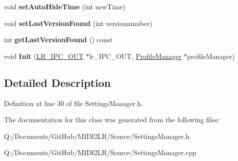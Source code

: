 \begin{DoxyCompactItemize}
\item 
void {\bfseries set\+Auto\+Hide\+Time} (int new\+Time)\hypertarget{class_settings_manager_a3b79a29f105519854b113d689e345f31}{}\label{class_settings_manager_a3b79a29f105519854b113d689e345f31}

\item 
void {\bfseries set\+Last\+Version\+Found} (int versionnumber)\hypertarget{class_settings_manager_ab66b7b0beeca459d573fe47b4a4f80b8}{}\label{class_settings_manager_ab66b7b0beeca459d573fe47b4a4f80b8}

\item 
int {\bfseries get\+Last\+Version\+Found} () const \hypertarget{class_settings_manager_ae5a55056fadea3ec3a015149ed5949a5}{}\label{class_settings_manager_ae5a55056fadea3ec3a015149ed5949a5}

\item 
void {\bfseries Init} (\hyperlink{class_l_r___i_p_c___o_u_t}{L\+R\+\_\+\+I\+P\+C\+\_\+\+O\+UT} $\ast$lr\+\_\+\+I\+P\+C\+\_\+\+O\+UT, \hyperlink{class_profile_manager}{Profile\+Manager} $\ast$profile\+Manager)\hypertarget{class_settings_manager_a126ecea64142a954b31c4fe2144a28c8}{}\label{class_settings_manager_a126ecea64142a954b31c4fe2144a28c8}

\end{DoxyCompactItemize}


\subsection{Detailed Description}


Definition at line 30 of file Settings\+Manager.\+h.



The documentation for this class was generated from the following files\+:\begin{DoxyCompactItemize}
\item 
Q\+:/\+Documents/\+Git\+Hub/\+M\+I\+D\+I2\+L\+R/\+Source/Settings\+Manager.\+h\item 
Q\+:/\+Documents/\+Git\+Hub/\+M\+I\+D\+I2\+L\+R/\+Source/Settings\+Manager.\+cpp\end{DoxyCompactItemize}
